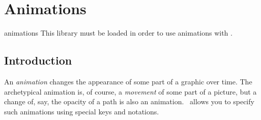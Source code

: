 %
%
%


\section{Animations}
\label{section-tikz-animations}

\begin{tikzlibrary}{animations}
    This library must be loaded in order to use animations with \tikzname.
\end{tikzlibrary}


\subsection{Introduction}

An \emph{animation} changes the appearance of some part of a graphic over time.
The archetypical animation is, of course, a \emph{movement} of some part of a
picture, but a change of, say, the opacity of a path is also an animation.
\tikzname\ allows you to specify such animations using special keys and
notations.
%
\begin{codeexample}[
    preamble={\usetikzlibrary{animations}},
    width=8cm,
    animation list={0.7,1.4,2.1,2.8},
    animation scale=.25,
]
\end{codeexample}

